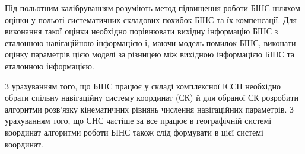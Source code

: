 Під польотним калібруванням розуміють метод підвищення роботи БІНС шляхом оцінки у польоті 
систематичних складових похибок БІНС та їх компенсації. Для виконання такої оцінки необхідно 
порівнювати вихідну інформацію БІНС з еталонною навігаційною інформацією і, маючи модель 
помилок БІНС, виконати оцінку параметрів цією моделі за різницею між вихідною інформацією 
БІНС та еталонною інформацією.

   З урахуванням того, що БІНС працює у складі комплексної ІССН необхідно обрати спільну 
навігаційну систему  координат (СК) й для обраної СК розробити  алгоритми розв’язку 
кінематичних рівнянь числення навігаційних параметрів. З урахуванням того, 
що СНС частіше за все працює в географічній системі координат алгоритми 
роботи БІНС також слід формувати в цієї системі координат.  


% 
